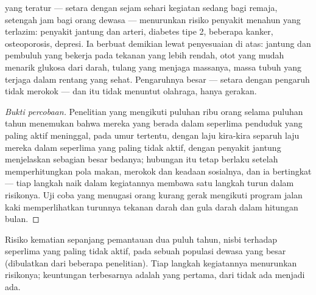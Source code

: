 \begin{proposition}\label{prop:g10:sport-and-health:health}
 yang teratur --- setara dengan sejam sehari kegiatan
sedang bagi remaja, setengah jam bagi orang dewasa --- menurunkan
risiko penyakit menahun yang terlazim: penyakit jantung dan arteri,
diabetes tipe 2, beberapa kanker, osteoporosis, depresi. Ia berbuat
demikian lewat penyesuaian di atas: jantung dan pembuluh yang bekerja
pada tekanan yang lebih rendah, otot yang mudah menarik glukosa dari
darah, tulang yang menjaga massanya, massa tubuh yang terjaga dalam
rentang yang sehat. Pengaruhnya besar --- setara dengan pengaruh tidak
merokok --- dan itu tidak menuntut olahraga, hanya gerakan.
\end{proposition}
\begin{proof}[Bukti percobaan]
Penelitian yang mengikuti puluhan ribu orang selama puluhan tahun
menemukan bahwa mereka yang berada dalam seperlima penduduk yang paling
aktif meninggal, pada umur tertentu, dengan laju kira-kira separuh laju
mereka dalam seperlima yang paling tidak aktif, dengan penyakit jantung
menjelaskan sebagian besar bedanya; hubungan itu tetap berlaku setelah
memperhitungkan pola makan, merokok dan keadaan sosialnya, dan ia
bertingkat --- tiap langkah naik dalam kegiatannya membawa satu langkah
turun dalam risikonya. Uji coba yang menugasi orang kurang gerak
mengikuti program jalan kaki memperlihatkan turunnya tekanan darah dan
gula darah dalam hitungan bulan.
\end{proof}

\begin{omfigure}

{\small Risiko kematian sepanjang pemantauan dua puluh tahun, nisbi
terhadap seperlima yang paling tidak aktif, pada sebuah populasi dewasa
yang besar (dibulatkan dari beberapa penelitian). Tiap langkah
kegiatannya menurunkan risikonya; keuntungan terbesarnya adalah yang
pertama, dari tidak ada menjadi ada.}
\end{omfigure}

